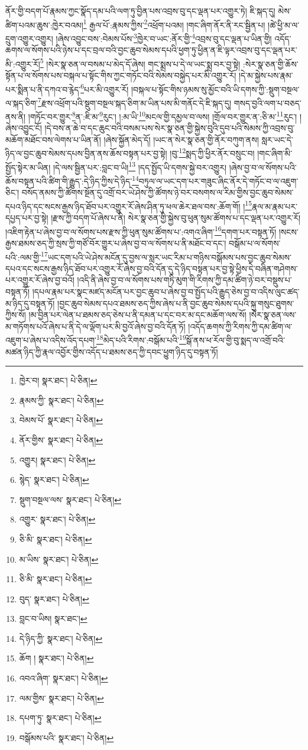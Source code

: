 ནོར་གྱི་བདག་པོ་རྣམས་ཀྱང་སྣོད་དམ་པའི་ལག་ཏུ་བྱིན་པས་འབྲས་བུ་དང་ལྡན་པར་འགྱུར་ཏེ། ཇི་སྐད་དུ། མེས་ཚིག་པའམ་ཆུས་:ཁྱེར་བའམ།\footnote{ཁྱེར་བ།  སྣར་ཐང་།  པེ་ཅིན། } རྒྱལ་པོ་:རྣམས་ཀྱིས་\footnote{རྣམས་ཀྱི་  སྣར་ཐང་།  པེ་ཅིན། }འཕྲོག་པའམ། །གང་ཞིག་ནོར་ནི་རང་སྦྱིན་པ། །ཚེ་ཕྱི་མ་ལ་དྲུག་འགྱུར་འགྱུར། །ཞེས་འབྱུང་བས་:བེམས་པོས་\footnote{བེམས་པོ་  སྣར་ཐང་།  པེ་ཅིན། }ཁྱེར་བ་ཡང་:ནོར་གྱི་\footnote{ནོར་གྱིས་  སྣར་ཐང་།  པེ་ཅིན། }འབྲས་བུ་དང་ལྡན་པ་ཡིན་གྱི། འདོད་ཆགས་ལ་སོགས་པའི་ཉེས་པ་དང་བྲལ་བའི་བྱང་ཆུབ་སེམས་དཔའི་ཕྱག་ཏུ་ཕྱིན་ན་ཇི་ལྟར་འབྲས་བུ་དང་ལྡན་པར་མི་:འགྱུར་རོ།\footnote{འགྱུར།  སྣར་ཐང་།  པེ་ཅིན། } །སེར་སྣ་ཅན་ལ་བསམ་པ་མེད་དོ་ཞེས། གང་སྨྲས་པ་དེ་ལ་ཡང་སྨྲ་བར་བྱ་སྟེ། :སེར་སྣ་ཅན་གྱི་ཆོས་སྟོན་པ་ལ་སོགས་པས་བསྐལ་པ་སྟོང་གིས་ཀྱང་གཏོང་བའི་སེམས་བསྐྱེད་པར་མི་འགྱུར་རོ། །དེ་མ་སྐྱེས་པས་རྣམ་པར་སྨིན་པ་ནི་དཀའ་བ་རྙེད་\footnote{སྙེད་  སྣར་ཐང་།  པེ་ཅིན། }པར་མི་འགྱུར་རོ། །བསྐལ་པ་སྟོང་གིས་ཉམས་སུ་མྱོང་བའི་ཡི་དགས་ཀྱི་:སྡུག་བསྔལ་ལ་སྐད་ཅིག་\footnote{སྡུག་བསྔལ་ལས་  སྣར་ཐང་།  པེ་ཅིན། }རྫས་འཕྲོག་པའི་སྡུག་བསྔལ་སྐད་ཅིག་མ་ཡིན་པས་མི་གནོང་དེ་ཇི་སྐད་དུ། གསད་བྱའི་ལག་པ་བཅད་ནས་ནི། །གཏོང་བར་གྱུར་\footnote{འགྱུར་  སྣར་ཐང་།  པེ་ཅིན། }ན་:ཇི་མ་\footnote{ཅི་མི་  སྣར་ཐང་།  པེ་ཅིན། }རུང་། །:མ་ཡི་\footnote{མ་ཡིས་  སྣར་ཐང་།  པེ་ཅིན། }མངལ་གྱི་དམྱལ་བ་ལས། །གྲོལ་བར་གྱུར་ན་:ཅི་མ་\footnote{ཅི་མི་  སྣར་ཐང་།  པེ་ཅིན། }རུང་། །ཞེས་འབྱུང་ངོ། །དེ་བས་ན་ཆེ་བ་དང་ཆུང་བའི་བསམ་པས་སེར་སྣ་ཅན་གྱི་སྐྱེས་བུའི་དུབ་པའི་སེམས་ཀྱི་འབྲས་བུ་མཆོག་མཐོང་བས་ལེགས་པ་ཡིན་ནོ། །ཞེས་སྐྱོན་མེད་དོ། །ཡང་ན་སེར་སྣ་ཅན་གྱི་ནོར་བཀུག་ནས། སླར་ཡང་དེ་ཉིད་ལ་བྱང་ཆུབ་སེམས་དཔས་བྱིན་ནས་ཆོས་བསྟན་པར་བྱ་སྟེ། །བུ་\footnote{བུད་  སྣར་ཐང་།  པེ་ཅིན། }སྨད་ཀྱི་ཕྱིར་ནོར་བསྲུང་བ། །གང་ཞིག་མི་སྤྱོད་སྟེར་མ་ཡིན། །དེ་ལས་སྦྱིན་པར་:བླང་བ་ཡི།\footnote{བླང་བ་ཡིས།  སྣར་ཐང་། } །དད་སྤྱོད་ཡི་དགས་སྐྱེ་བར་འགྱུར། །ཞེས་བྱ་བ་ལ་སོགས་པའི་ཆོས་བསྟན་པའི་ཚིག་གི་རྒྱུད་:དེ་ཉིད་ཀྱིས་དེ་ཉིད་\footnote{དེ་ཉིད་ཀྱི་  སྣར་ཐང་།  པེ་ཅིན། }བཏུལ་ལ་ཡང་དག་པར་གཟུང་ཞིང་ནོར་དེ་གཏོང་བ་ལ་འཇུག་ཅིང་། བསོད་ནམས་ཀྱི་ཚོགས་སྔོན་དུ་འགྲོ་བར་ཡེ་ཤེས་ཀྱི་ཚོགས་ཉེ་བར་བསགས་ལ་རིམ་གྱིས་བྱང་ཆུབ་སེམས་དཔའ་ཉིད་དང་སངས་རྒྱས་ཉིད་ཐོབ་པར་འགྱུར་རོ་ཞེས་ཤིན་ཏུ་ཕལ་ཆེར་ཐལ་བས་:ཆོག་གོ། །\footnote{ཆོག །  སྣར་ཐང་།  པེ་ཅིན། }རྣལ་མ་རྣམ་པར་དཔྱད་པར་བྱ་སྟེ། །རྫས་ཀྱི་བདག་པོ་ཞེས་པ་ནི། སེར་སྣ་ཅན་གྱི་སྐྱེས་བུ་ཕུན་སུམ་ཚོགས་པ་དང་ལྡན་པར་འགྱུར་རོ། །འཇིག་རྟེན་པ་ཞེས་བྱ་བ་ལ་སོགས་པས་རྫས་ཀྱི་ཕུན་སུམ་ཚོགས་པ་:འགའ་ཞིག་\footnote{འབའ་ཞིག་  སྣར་ཐང་།  པེ་ཅིན། }དགག་པར་བསྟན་ཏོ། །སངས་རྒྱས་ཐམས་ཅད་ཀྱི་སྲས་ཀྱི་གཙོ་བོར་གྱུར་པ་ཞེས་བྱ་བ་ལ་སོགས་པ་ནི་མཐོང་བ་དང་། བསྒོམ་པ་ལ་སོགས་པའི་:ལམ་གྱི་\footnote{ལམ་གྱིས་  སྣར་ཐང་།  པེ་ཅིན། }ཡང་དག་པའི་ཡེ་ཤེས་མངོན་དུ་བྱས་ལ་སླར་ཡང་རིམ་པ་གཉིས་བསྒོམས་པས་བྱང་ཆུབ་སེམས་དཔའ་དང་སངས་རྒྱས་ཉིད་ཐོབ་པར་འགྱུར་རོ་ཞེས་བྱ་བའི་དོན་དུ་དེ་ཉིད་བསྟན་པར་བྱ་སྟེ་ཕྱིས་དེ་བཞིན་གཤེགས་པར་འགྱུར་རོ་ཞེས་བྱ་བའོ། །འདི་ནི་ཞེས་བྱ་བ་ལ་སོགས་པས་གཏི་མུག་གི་རིགས་ཀྱི་དམ་ཚིག་ཉེ་བར་བསྡུས་པ་བསྟན་ཏོ། །དཔལ་རྣམ་པར་སྣང་མཛད་མངོན་པར་བྱང་ཆུབ་པ་ཞེས་བྱ་བ་སྤྱོད་པའི་རྒྱུད་ཅེས་བྱ་བ་འདིས་ལུང་ཚད་མ་ཉིད་དུ་བསྟན་ཏོ། །བྱང་ཆུབ་སེམས་དཔའ་ཐམས་ཅད་ཀྱིས་ཞེས་པ་ནི་བྱང་ཆུབ་སེམས་དཔའི་སྐུ་གསུང་ཐུགས་ཀྱིས་སོ། །མ་བྱིན་པར་ལེན་པ་ཐམས་ཅད་ཅེས་པ་ནི་དམན་པ་དང་བར་མ་དང་མཆོག་ལས་སོ། །སེར་སྣ་ཅན་ལས་མ་གཏོགས་པའོ་ཞེས་པ་ནི་དེ་ལ་ལྡོག་པར་མི་བྱའོ་ཞེས་བྱ་བའི་དོན་ཏོ། །འདོད་ཆགས་ཀྱི་རིགས་ཀྱི་དམ་ཚིག་ལ་འཇུག་པ་ཞེས་པ་འདིས་འོད་དཔག་\footnote{དཔག་ཏུ་  སྣར་ཐང་།  པེ་ཅིན། }མེད་པའི་རིགས་:བསྒོམ་པའི་\footnote{བསྒོམས་པའི་  སྣར་ཐང་།  པེ་ཅིན། }སྒོ་ནས་ཕ་རོལ་གྱི་བུ་སྨད་ལ་འགྲོ་བའི་མཚན་ཉིད་ཀྱི་རྣལ་འབྱོར་གྱིས་འདོད་པ་ཐམས་ཅད་ཀྱི་དབང་ཕྱུག་ཉིད་དུ་བསྟན་ཏོ། 